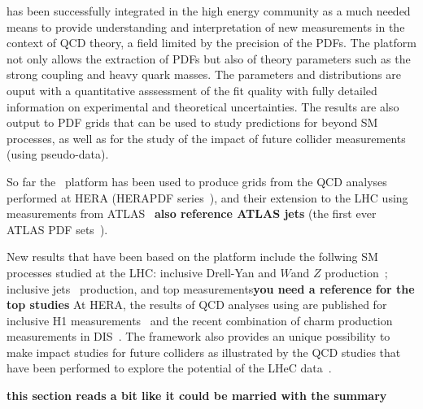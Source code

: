 \fitter has been successfully integrated in the high energy community as a much needed means to provide understanding and interpretation of new measurements in the context of QCD theory, a field limited by the precision of the PDFs.  
The \fitter platform not only allows the extraction of PDFs but also of theory parameters such as the strong coupling and heavy quark masses. The parameters and distributions are ouput with a
quantitative asssessment of the fit quality with fully detailed information on 
experimental and theoretical uncertainties.
The results are also output to PDF grids that can be used to study predictions for beyond SM processes, as well as for the study of the impact of 
future collider measurements (using pseudo-data).


So far the \fitter\ platform has been used to produce grids 
from the QCD analyses performed at 
HERA (HERAPDF series~\cite{h1zeus:2009wt}), and their extension to the LHC 
using 
measurements from ATLAS~\cite{atlas:strange} {\bf also reference ATLAS jets} (the first ever ATLAS PDF sets~\cite{atlas:grids}).

New results that have been based on the \fitter platform include 
the follwing SM processes 
studied at the LHC:  inclusive Drell-Yan and $W$and $Z$ 
production~\cite{atlas:strange,atlas:hm,cms:strange};
inclusive jets~\cite{atlas:jets,cms:jets} production, and top measurements{\bf you need a reference for the top studies}
At HERA, the results of QCD analyses using \fitter are 
published for inclusive H1 measurements~\cite{h1:2012kk}
and the recent combination of charm production measurements 
in DIS~\cite{h1zeus:charm}.
The \fitter framework also provides an unique possibility to 
make impact studies for future colliders
as illustrated by the QCD studies that have been performed to 
explore the potential of the LHeC data~\cite{lhec:studies}.

{\bf this section reads a bit like it could be married with the summary}